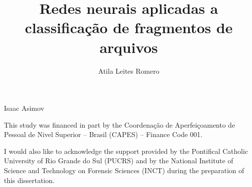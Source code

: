 \documentclass[english,oneside]{pucrs-ppgcc}
\author{Atila Leites Romero}
\title{Redes neurais aplicadas a classificação de fragmentos de arquivos}
      {Applied neural networks for file fragment classification}
\begin{document}

%
         {Isaac Asimov}


\begin{agradecimentos}
This study was financed in part by the Coordenação de Aperfeiçoamento de Pessoal de Nivel Superior – Brasil (CAPES) – Finance Code 001.

I would also like to acknowledge the support provided by the Pontifical Catholic University of Rio Grande do Sul (PUCRS) and by the National Institute of Science and Technology on Forensic Sciences (INCT) during the preparation of this dissertation.

\end{agradecimentos}





\listoffigures       %
\listoftables        %
\listofalgorithms    %
\listofacronyms      %
\listofabbreviations %
\listofsymbols       %
\tableofcontents     %
\end{document}
